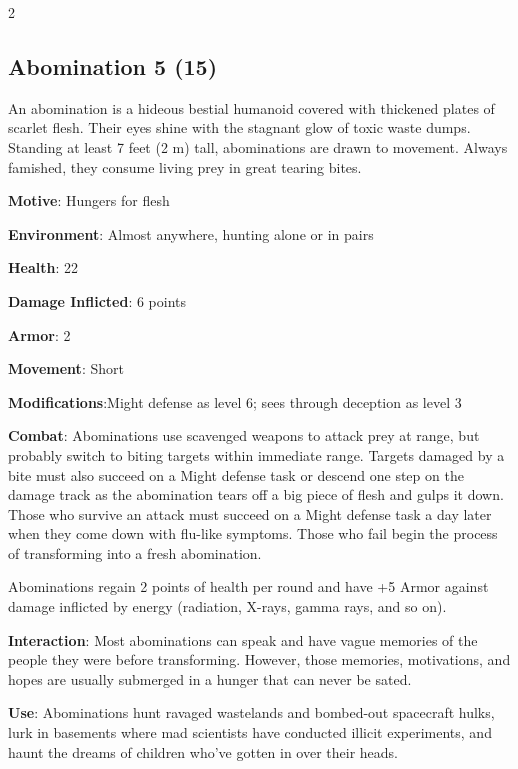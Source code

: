 \begin{multicols}{2}
\subsection{Abomination	5 (15)}

An abomination is a hideous bestial humanoid covered with thickened plates of scarlet flesh. Their eyes shine with the stagnant glow of toxic waste dumps. Standing at least 7 feet (2 m) tall, abominations are drawn to movement. Always famished, they consume living prey in great tearing bites.

\textbf{Motive}: Hungers for flesh

\textbf{Environment}: Almost anywhere, hunting alone or in pairs

\textbf{Health}: 22

\textbf{Damage Inflicted}: 6 points

\textbf{Armor}: 2

\textbf{Movement}: Short

\textbf{Modifications}:Might defense as level 6; sees through deception as level 3

\textbf{Combat}: Abominations use scavenged weapons to attack prey at range, but probably switch to biting targets within immediate range. Targets damaged by a bite must also succeed on a Might defense task or descend one step on the damage track as the abomination tears off a big piece of flesh and gulps it down. Those who survive an attack must succeed on a Might defense task a day later when they come down with flu-like symptoms. Those who fail begin the process of transforming into a fresh abomination.

Abominations regain 2 points of health per round and have +5 Armor against damage inflicted by energy (radiation, X-rays, gamma rays, and so on).

\textbf{Interaction}: Most abominations can speak and have vague memories of the people they were before transforming. However, those memories, motivations, and hopes are usually submerged in a hunger that can never be sated.

\textbf{Use}: Abominations hunt ravaged wastelands and bombed-out spacecraft hulks, lurk in basements where mad scientists have conducted illicit experiments, and haunt the dreams of children who’ve gotten in over their heads.


\end{multicols}
